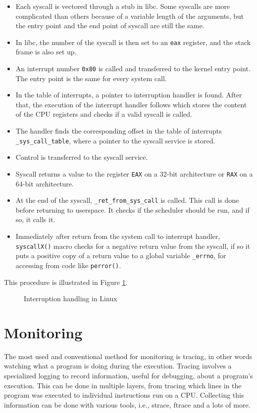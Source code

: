 \begin{itemize}
	\item Each syscall is vectored through a stub in libc.
    	  Some syscalls are more complicated than others because of a variable length of the arguments, but the entry point and the end point of syscall are still the same.
	\item In libc, the number of the syscall is then set to an \texttt{eax} register, and the stack frame is also set up.
	\item An interrupt number \texttt{0x80} is called and transferred to the kernel entry point.
    	  The entry point is the same for every system call.
	\item In the table of interrupts, a pointer to interruption handler is found.
    	  After that, the execution of the interrupt handler follows which stores the content of the CPU registers and checks if a valid syscall is called.
	\item The handler finds the corresponding offset in the table of interrupts \texttt{\_sys\_call\_table}, where a pointer to the syscall service is stored.
	\item Control is transferred to the syscall service.
	\item Syscall returns a value to the register \texttt{EAX} on a 32-bit architecture or \texttt{RAX} on a 64-bit architecture.
	\item At the end of the syscall, \texttt{\_ret\_from\_sys\_call\(\)} is called.
    	  This call is done before returning to userspace.
          It checks if the scheduler should be run, and if so, it calls it.
	\item Immediately after return from the system call to interrupt handler, \texttt{syscallX()} macro checks for a negative return value from the syscall, if so it puts a positive copy of a return value to a global variable \texttt{\_errno}, for accessing from code like \texttt{perror()}.
\end{itemize}

This procedure is illustrated in Figure \ref{fig:tikz:int_handling}. \cite{Silberschatz2013}

\begin{figure}[]
  \centering
  
  \caption{Interruption handling in Linux}
  \label{fig:tikz:int_handling}
\end{figure}


\section{Monitoring}
The most used and conventional method for monitoring is tracing, in other words watching what a program is doing during the execution.
Tracing involves a specialized logging to record information, useful for debugging, about a program's execution.
This can be done in multiple layers, from tracing which lines in the program was executed to individual instructions run on a CPU.
Collecting this information can be done with various tools, i.e., strace, ftrace and a lots of more.

